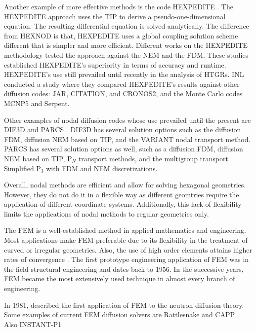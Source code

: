 \documentclass[11pt,letterpaper]{article}
\begin{document}
Another example of more effective methods is the code HEXPEDITE \cite{fitzpatrick_hexpedite_1992}.
The HEXPEDITE approach uses the \gls{TIP} to derive a pseudo-one-dimensional equation.
The resulting differential equation is solved analytically.
The difference from HEXNOD is that, HEXPEDITE uses a global coupling solution scheme different that is simpler and more efficient.
Different works \cite{fitzpatrick_hexpedite_1992}\cite{fitzpatrick_developments_1995} on the HEXPEDITE methodology tested the approach against the \gls{NEM} and the \gls{FDM}.
These studies established HEXPEDITE’s superiority in terms of accuracy and runtime.
HEXPEDITE's use still prevailed until recently in the analysis of \glspl{HTGR}.
INL conducted a study \cite{ortensi_deterministic_2010-1} where they compared HEXPEDITE's results against other diffusion codes: JAR, CITATION, and CRONOS2, and the Monte Carlo codes MCNP5 and Serpent.

Other examples of nodal diffusion codes whose use prevailed until the present are DIF3D \cite{lawrence_dif3d_1983} and PARCS \cite{downar_parcs_2004}.
DIF3D has several solution options such as the diffusion \gls{FDM}, diffusion \gls{NEM} based on \gls{TIP}, and the VARIANT nodal transport method.
PARCS has several solution options as well, such as a diffusion \gls{FDM}, diffusion \gls{NEM} based on \gls{TIP}, P$_{N}$ transport methods, and the multigroup transport Simplified P$_3$ with \gls{FDM} and \gls{NEM} discretizations.

Overall, nodal methods are efficient and allow for solving hexagonal geometries.
However, they do not do it in a flexible way as different geomtries require the application of different coordinate systems.
Additionally, this lack of flexibility limits the applications of nodal methods to regular geometries only.

The \gls{FEM} is a well-established method in applied mathematics and engineering.
Most applications make \gls{FEM} preferable due to its flexibility in the treatment of curved or irregular geometries.
Also, the use of high order elements attains higher rates of convergence \cite{cavdar_finite_2004}.
The first prototype engineering application of \gls{FEM} was in the field structural engineering and dates back to 1956.
In the successive years, \gls{FEM} became the most extensively used technique in almost every branch of engineering.

In 1981, \cite{lewis_finite_1981} described the first application of \gls{FEM} to the neutron diffusion theory.
Some examples of current \gls{FEM} diffusion solvers are Rattlesnake \cite{wang_rattlesnake_2019} and CAPP \cite{lee_development_2011}.
Also INSTANT-P1
\end{document}
